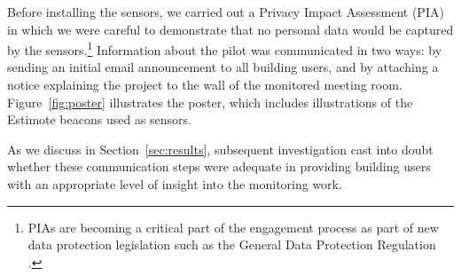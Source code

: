 Before installing the sensors, we carried out a Privacy Impact
Assessment (PIA) in which we were careful to demonstrate that no
personal data would be captured by the sensors.\footnote{PIAs are
  becoming a critical part of the engagement process as part of new
  data protection legislation such as the General Data Protection
  Regulation \cite{GDPR}.} Information about the pilot was
communicated in two ways: by sending an initial email announcement to
all building users, and by attaching a notice explaining the project
to the wall of the monitored meeting room. Figure~\ref{fig:poster}
illustrates the poster, which includes illustrations of the Estimote
beacons used as sensors.

As we discuss in Section~\ref{sec:results}, subsequent investigation
cast into doubt whether these communication steps were adequate in providing
building users with an appropriate level of insight into the
monitoring work.

